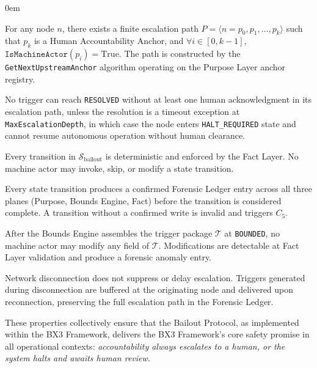 \begin{trivlist}\itemindent0em
\item[\textbf{Upstream Accountability Guarantee}] For any node $n$, there exists a
  finite escalation path $P = \langle n = p_0, p_1, \ldots, p_k \rangle$ such that
  $p_k$ is a Human Accountability Anchor, and $\forall i \in [0, k-1]$,
  $\texttt{IsMachineActor}(p_i) = \text{True}$. The path is constructed by the
  \texttt{GetNextUpstreamAnchor} algorithm operating on the Purpose Layer anchor
  registry.

\item[\textbf{Non-Orphaning Guarantee}] No trigger can reach \texttt{RESOLVED} without
  at least one human acknowledgment in its escalation path, unless the resolution is
  a timeout exception at \texttt{MaxEscalationDepth}, in which case the node enters
  \texttt{HALT\_REQUIRED} state and cannot resume autonomous operation without human
  clearance.

\item[\textbf{Deterministic State Transitions}] Every transition in
  $\mathcal{S}_{\text{bailout}}$ is deterministic and enforced by the Fact Layer.
  No machine actor may invoke, skip, or modify a state transition.

\item[\textbf{Audit Completeness Guarantee}] Every state transition produces a
  confirmed Forensic Ledger entry across all three planes (Purpose, Bounds Engine,
  Fact) before the transition is considered complete. A transition without a
  confirmed write is invalid and triggers $C_5$.

\item[\textbf{Immutable Trigger Package}] After the Bounds Engine assembles the
  trigger package $\mathcal{T}$ at \texttt{BOUNDED}, no machine actor may modify any
  field of $\mathcal{T}$. Modifications are detectable at Fact Layer validation and
  produce a forensic anomaly entry.

\item[\textbf{Graceful Degradation}] Network disconnection does not suppress or delay
  escalation. Triggers generated during disconnection are buffered at the originating
  node and delivered upon reconnection, preserving the full escalation path in the
  Forensic Ledger.
\end{trivlist}

These properties collectively ensure that the Bailout Protocol, as implemented within
the BX3 Framework, delivers the BX3 Framework's core safety promise in all operational
contexts: \emph{accountability always escalates to a human, or the system halts and
awaits human review.}